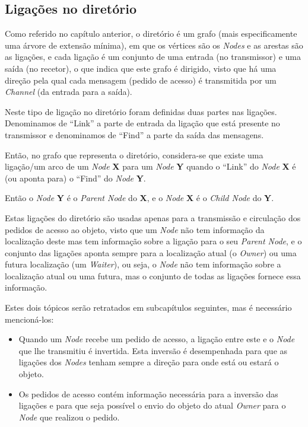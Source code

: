 \subsection*{Ligações no diretório}

Como referido no capítulo anterior, o diretório é um grafo (mais especificamente uma árvore de extensão mínima), em que os vértices são os \emph{Nodes} e as arestas são as ligações, e cada ligação é um conjunto de uma entrada (no transmissor) e uma saída (no recetor), o que indica que este grafo é dirigido, visto que há uma direção pela qual cada mensagem (pedido de acesso) é transmitida por um \emph{Channel} (da entrada para a saída).

Neste tipo de ligação no diretório foram definidas duas partes nas ligações. Denominamos de  ``Link'' a parte de entrada da ligação que está presente no transmissor e denominamos de ``Find'' a parte da saída das mensagens.

Então, no grafo que representa o diretório, considera-se que existe uma ligação/um arco de um \emph{Node} \textbf{X} para um \emph{Node} \textbf{Y} quando o ``Link'' do 
\emph{Node} \textbf{X}  é (ou aponta para) o ``Find'' do \emph{Node} \textbf{Y}.

Então o \emph{Node} \textbf{Y} é o \emph{Parent Node} do \textbf{X}, e o \emph{Node} \textbf{X} é o \emph{Child Node} do \textbf{Y}.

Estas ligações do diretório são usadas apenas para a transmissão e circulação dos pedidos de acesso ao objeto, visto que um \emph{Node} não tem informação da localização deste mas tem informação sobre a ligação para o seu \emph{Parent Node},
e o conjunto das ligações aponta sempre para a localização atual (o \emph{Owner}) ou uma futura localização (um \emph{Waiter}), ou seja, o \emph{Node} não tem informação sobre a localização atual ou uma futura, mas o conjunto de todas as ligações fornece essa informação.

Estes dois tópicos serão retratados em subcapítulos seguintes, mas é necessário mencioná-los:
\begin{itemize}
    \item Quando um \emph{Node} recebe um pedido de acesso, a ligação entre este e o \emph{Node} que lhe transmitiu é invertida. Esta inversão é desempenhada para que as ligações dos \emph{Nodes} tenham sempre a direção para onde está ou estará o objeto.

    \item Os pedidos de acesso contém informação necessária para a inversão das ligações e para que seja possível o envio do objeto do atual \emph{Owner} para o \emph{Node} que realizou o pedido.
\end{itemize}

